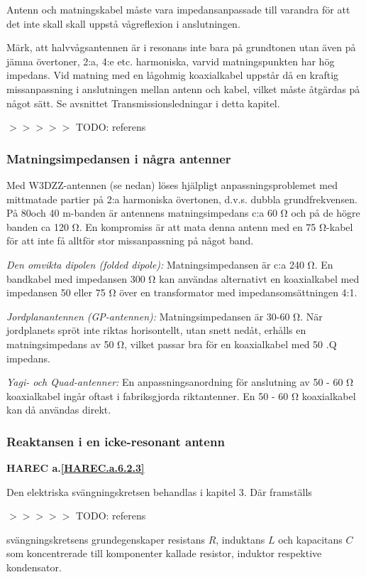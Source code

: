 Antenn och matningskabel måste vara impedansanpassade till varandra
för att det inte skall skall uppstå vågreflexion i anslutningen.

Märk, att halvvågsantennen är i resonans inte bara på grundtonen utan
även på jämna övertoner, 2:a, 4:e etc. harmoniska, varvid
matningspunkten har hög impedans.  Vid matning med en lågohmig
koaxialkabel uppstår då en kraftig missanpassning i anslutningen
mellan antenn och kabel, vilket måste åtgärdas på något sätt. Se
avsnittet Transmissionsledningar i detta kapitel.

$>>>>>$ TODO: referens

\subsubsection{Matningsimpedansen i några antenner}
Med W3DZZ-antennen (se nedan) löses hjälpligt anpassningsproblemet med
mittmatade partier på 2:a harmoniska övertonen, d.v.s. dubbla
grundfrekvensen. På 80och 40 m-banden är antennens matningsimpedans
c:a 60 Ω och på de högre banden ca 120 Ω. En kompromiss är att mata
denna antenn med en 75 Ω-kabel för att inte få alltför stor
missanpassning på något band.

\emph{Den omvikta dipolen (folded dipole):}
Matningsimpedansen är c:a 240 Ω. En bandkabel med impedansen 300 Ω kan
användas alternativt en koaxialkabel med impedansen 50 eller 75 Ω över
en transformator med impedansomsättningen 4:1.

\emph{Jordplanantennen (GP-antennen):} Matningsimpedansen är 30-60
Ω. När jordplanets spröt inte riktas horisontellt, utan snett nedåt,
erhålls en matningsimpedans av 50 Ω, vilket passar bra för en
koaxialkabel med 50 .Q impedans.

\emph{Yagi- och Quad-antenner:} En anpassningsanordning för anslutning
av 50 - 60 Ω koaxialkabel ingår oftast i fabriksgjorda
riktantenner. En 50 - 60 Ω koaxialkabel kan då användas direkt.

\subsubsection{Reaktansen i en icke-resonant antenn}
\textbf{
HAREC a.\ref{HAREC.a.6.2.3}\label{myHAREC.a.6.2.3}
}

Den elektriska svängningskretsen behandlas i kapitel 3. Där framställs

$>>>>>$ TODO: referens

svängningskretsens grundegenskaper resistans \(R\), induktans \(L\)
och kapacitans \(C\) som koncentrerade till komponenter kallade
resistor, induktor respektive kondensator.

